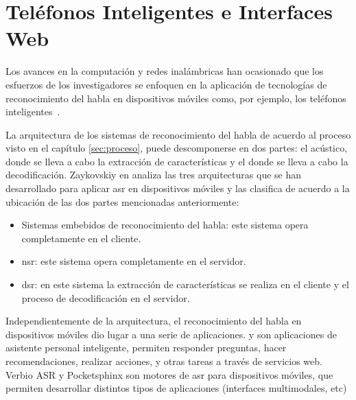 \section{Tel\'efonos Inteligentes e Interfaces Web}
\label{sec:smartphones}

Los avances en la computaci\'on y redes inal\'ambricas han ocasionado
que los esfuerzos de los investigadores se enfoquen en la aplicaci\'on de tecnolog\'ias de
reconocimiento del habla en dispositivos m\'oviles como, por ejemplo, los tel\'efonos 
\mbox{inteligentes \cite{TanAutomatic2008}}.

La arquitectura de los sistemas de reconocimiento del habla de acuerdo al proceso visto en el 
cap\'itulo \ref{sec:proceso}, puede descomponerse en dos partes: el  ac\'ustico,
donde se lleva a cabo la extracci\'on de caracter\'isticas  y el  donde se 
lleva a cabo la decodificaci\'on. 
Zaykovskiy en \cite{ZaykovskiySurvey2006} analiza las tres arquitecturas que se han desarrollado
para aplicar \gls{asr} en dispositivos m\'oviles y las clasifica de acuerdo a la ubicaci\'on de las 
dos partes mencionadas anteriormente:

\begin{itemize}
    \item Sistemas embebidos de reconocimiento del habla: este sistema opera completamente en el cliente.
    \item \gls{nsr}: este sistema opera completamente en el servidor. 
    \item \gls{dsr}: en este sistema la extracci\'on de caracter\'isticas se realiza
        en el cliente y el proceso de decodificaci\'on en el servidor.
\end{itemize}

Independientemente de la arquitectura, el reconocimiento del habla en dispositivos m\'oviles 
dio lugar a una serie de aplicaciones.  \cite{AppleSiri, OneAccordSiri} y 
 \cite{GoogleNow} son aplicaciones de asistente personal inteligente, permiten 
responder preguntas, hacer recomendaciones, realizar acciones, y otras tareas a trav\'es de servicios web. 
Verbio ASR \cite{VerbioASR} y Pocketsphinx \cite{HugginsDainesPocketSphinx2006, PocketSphinxHomePage} son 
motores de \gls{asr} para dispositivos m\'oviles, que permiten desarrollar distintos tipos de aplicaciones 
(interfaces multimodales, etc)


